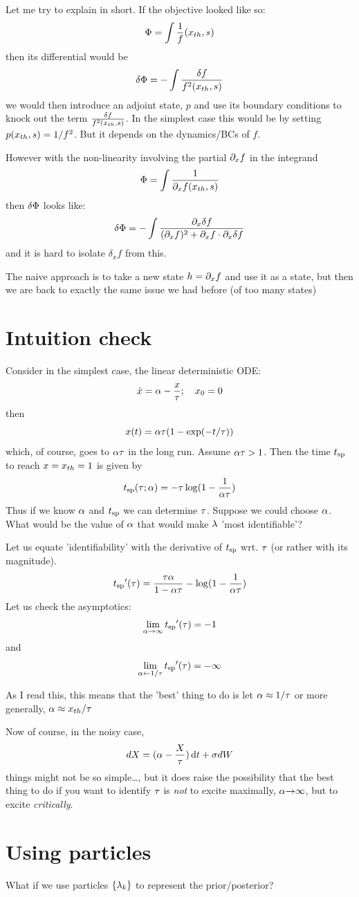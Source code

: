 \documentclass{article}
\begin{document}
Let me try to explain in short. If the objective looked like so:
$$
{\Phi} = \int \frac 1 f({ x_{th} },s) $$
then its differential would be
$$ 
\delta {\Phi} =  -\int \frac {\delta f}{f^2({ x_{th} },s)}
$$
we would then introduce an adjoint state, $p$ and use its boundary conditions to
knock out the term $\frac {\delta f}{f^2({ x_{th} },s)}$. In the simplest case this
would be by setting $p({ x_{th} }, s ) = 1 / f^2$. But it depends on the dynamics/BCs
of $f$. 

However with the non-linearity involving the partial ${\partial}_x f$ in the
integrand
$$
{\Phi} = \int \frac 1 {{\partial}_x f({ x_{th} },s)} $$
 then $\delta {\Phi}$ looks like:
$$ 
\delta {\Phi} =  -\int \frac{{\partial}_x \delta f}{ ({\partial}_x f)^2 + {\partial}_xf \cdot {\partial}_x
\delta f} $$
and it is hard to isolate $\delta_x f$ from this. 

The naive approach is to take a new state $h = {\partial}_x f$ and use it as a state,
but then we are back to exactly the same issue we had before (of too many
states)


\section{Intuition check}
Consider in the simplest case, the linear deterministic ODE:
$$
\dot{x} = {\alpha} - \frac{x}{{\tau}}; \quad x_0 = 0
$$
then
$$
x(t) =  {\alpha}{\tau} (1 - \exp(-t / {\tau}))
$$
which, of course, goes to ${\alpha}{\tau}$ in the long run. 
Assume ${\alpha}{\tau} > 1$. Then the time ${ t_{\textrm{sp} } }$ to reach $x = { x_{th} } = 1$
is given by
$$
{ t_{\textrm{sp} } } ({\tau}; {\alpha}) = -{\tau}  \log( 1- \frac{1}{{\alpha}{\tau}})
$$
Thus if we know
${\alpha}$ and ${ t_{\textrm{sp} } }$ we can determine ${\tau}$. Suppose we could choose ${\alpha}$. What would
be the value of ${\alpha}$ that would make ${\lambda}$ 'most identifiable'?

Let us equate 'identifiability' with the derivative of ${ t_{\textrm{sp} } }$ wrt. ${\tau}$ (or
rather with its magnitude).
$$
{ t_{\textrm{sp} } }'({\tau}) = \frac{{\tau}{\alpha}}{ 1 - {\alpha}{\tau}} - \log(1-\frac{1}{{\alpha}{\tau}})   
$$
Let us check the asymptotics:
$$
\lim_{{\alpha} {\rightarrow} \infty} { t_{\textrm{sp} } }'({\tau}) = -1
$$
and 
$$
\lim_{{\alpha} {\leftarrow} 1/{\tau}} { t_{\textrm{sp} } }'({\tau}) =   -\infty
$$
 
As I read this, this means that the 'best' thing to do is let ${\alpha} \approx 1 /
{\tau}$ or more generally, ${\alpha} \approx { x_{th} } / {\tau}$

Now of course, in the noisy case, 
$$
dX = ({\alpha} - \frac{X}{{\tau}}) \, \mathrm{d} t + {\sigma } dW 
$$
things might not be so simple\ldots, but it does raise the possibility that the
best thing to do if you want to identify ${\tau}$ is {\itshape not} to excite
maximally, ${\alpha} {\rightarrow} \infty$, but to excite {\itshape critically}.


\section{Using particles}
What if we use particles $\{{\lambda}_k\}$ to represent the prior/posterior?
\end{document}
